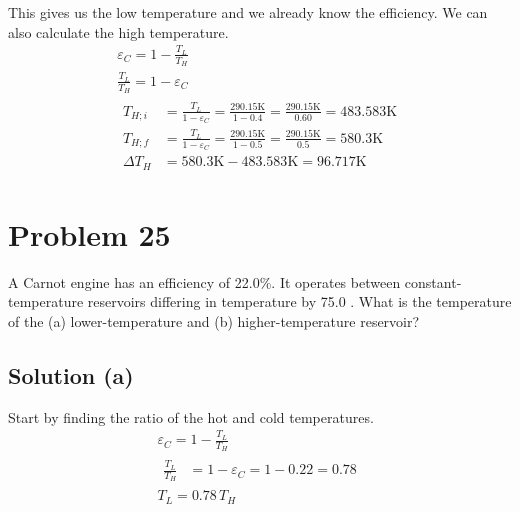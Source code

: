 \documentclass[12pt]{article}
\begin{document}
            This gives us the low temperature and we already know the efficiency. 
            We can also calculate the high temperature.
            \begin{gather}
                \varepsilon_C   =   1 - \frac{T_L}{T_H}\\
                \frac{T_L}{T_H} =   1 - \varepsilon_C\\
                \begin{align}
                    T_{H;i} &=  \frac{T_L}{1 - \varepsilon_C}
                        =   \frac{290.15\unit{\kelvin}}{1 - 0.4}
                        =   \frac{290.15\unit{\kelvin}}{0.60}
                        =   483.583\unit{\kelvin}\\
                    T_{H;f} &=  \frac{T_L}{1 - \varepsilon_C}
                        =   \frac{290.15\unit{\kelvin}}{1 - 0.5}
                        =   \frac{290.15\unit{\kelvin}}{0.5}
                        =   580.3\unit{\kelvin}\\
                    \Delta T_H  &=  580.3\unit{\kelvin} - 483.583\unit{\kelvin}
                        =   \boxed{96.717\unit{\kelvin}}
                \end{align}
            \end{gather}

    \pagebreak
    \section{Problem 25}
        A Carnot engine has an efficiency of 22.0\%. 
        It operates between constant-temperature reservoirs differing in temperature by 75.0 \unit{\celsiusdegree}. 
        What is the temperature of the (a) lower-temperature and (b) higher-temperature reservoir?

        \subsection{Solution (a)}
            Start by finding the ratio of the hot and cold temperatures.
            \begin{gather}
                \varepsilon_C   =   1 - \frac{T_L}{T_H}\\
                \begin{align}
                    \frac{T_L}{T_H} &=  1 - \varepsilon_C
                        =   1 - 0.22
                        =   0.78
                \end{align}\\
                T_L =   0.78\,T_H
            \end{gather}
\end{document}
